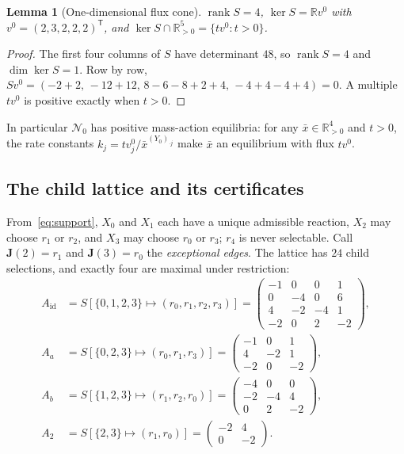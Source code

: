 \documentclass[11pt,a4paper]{article}
\theoremstyle{plain}
\newtheorem{lemma}[theorem]{Lemma}
\theoremstyle{definition}
\theoremstyle{remark}
\newcommand{\R}{\mathbb{R}}
\newcommand{\rank}{\operatorname{rank}}
\newcommand{\xbar}{\bar{x}}
\begin{document}
\begin{lemma}[One-dimensional flux cone]\label{lem:kernel}
$\rank S=4$, $\ker S=\R v^0$ with $v^0=(2,3,2,2,2)^{\mathsf T}$, and $\ker S\cap\R^5_{>0}=\{tv^0: t>0\}$.
\end{lemma}

\begin{proof}
The first four columns of $S$ have determinant $48$, so $\rank S=4$ and $\dim\ker S=1$. Row by row, $Sv^0=(-2+2,\,-12+12,\,8-6-8+2+4,\,-4+4-4+4)=0$. A multiple $tv^0$ is positive exactly when $t>0$.
\end{proof}

In particular $\mathcal N_0$ has positive mass-action equilibria: for any $\xbar\in\R^4_{>0}$ and $t>0$, the rate constants $k_j=tv^0_j/\xbar^{(Y_0)_{\cdot j}}$ make $\xbar$ an equilibrium with flux $tv^0$.

\subsection{The child lattice and its certificates}

From~\eqref{eq:support}, $X_0$ and $X_1$ each have a unique admissible reaction, $X_2$ may choose $r_1$ or $r_2$, and $X_3$ may choose $r_0$ or $r_3$; $r_4$ is never selectable. Call $\mathbf J(2)=r_1$ and $\mathbf J(3)=r_0$ the \emph{exceptional edges}. The lattice has $24$ child selections, and exactly four are maximal under restriction:
\begin{equation}\label{eq:children}
\begin{aligned}
A_{\mathrm{id}}&=S[\{0,1,2,3\}\mapsto(r_0,r_1,r_2,r_3)]=\begin{pmatrix}-1&0&0&1\\0&-4&0&6\\4&-2&-4&1\\-2&0&2&-2\end{pmatrix},\\[4pt]
A_{a}&=S[\{0,2,3\}\mapsto(r_0,r_1,r_3)]=\begin{pmatrix}-1&0&1\\4&-2&1\\-2&0&-2\end{pmatrix},\\[4pt]
A_{b}&=S[\{1,2,3\}\mapsto(r_1,r_2,r_0)]=\begin{pmatrix}-4&0&0\\-2&-4&4\\0&2&-2\end{pmatrix},\\[4pt]
A_{2}&=S[\{2,3\}\mapsto(r_1,r_0)]=\begin{pmatrix}-2&4\\0&-2\end{pmatrix}.
\end{aligned}
\end{equation}
\end{document}
